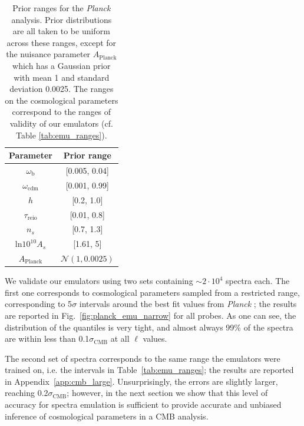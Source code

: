 \documentclass[fleqn,usenatbib]{mnras}
\begin{document}
\begin{table}
  \centering 
  \begin{tabular}{c|c}
    \textbf{Parameter}               &  \textbf{Prior range}   \\
    \hline
    \hline
    $\omega_{\mathrm{b}}$            &   [0.005, 0.04]    \\
    \hline
    $\omega_{\mathrm{cdm}}$          &    [0.001, 0.99]        \\
    \hline
    $h$                              &    [0.2, 1.0]         \\
    \hline
    $\tau_{\mathrm{reio}}$                              &    [0.01, 0.8]         \\
    \hline
    $n_s$                            &        [0.7, 1.3]      \\
    \hline
    $\mathrm{ln}10^{10}A_s$          &      [1.61, 5]       \\
    \hline
    $A_{\mathrm{Planck}}$            &      $\mathcal{N}(1, 0.0025)$       \\
    \hline
    \hline
    \end{tabular}
   \caption{Prior ranges for the \textit{Planck} analysis. Prior distributions are all taken to be uniform across these ranges, except for the nuisance parameter $A_{\mathrm{Planck}}$ which has a Gaussian prior with mean 1 and standard deviation 0.0025. The ranges on the cosmological parameters correspond to the ranges of validity of our emulators (cf. Table \ref{tab:emu_ranges}).}
  \label{tab:prior_planck}
\end{table}

We validate our emulators using two sets containing  $\sim 2 \cdot 10^4$ spectra each. The first one corresponds to cosmological parameters sampled from a restricted range, corresponding to 5$\sigma$ intervals around the best fit values from \textit{Planck} \citep{Planck18}; the results are reported in Fig.~\ref{fig:planck_emu_narrow} for all probes. As one can see, the distribution of the quantiles is very tight, and almost always 99\% of the spectra are within less than 0.1$\sigma_{\textrm{CMB}}$ at all $\ell$ values.

The second set of spectra corresponds to the same range the emulators were trained on, i.e. the intervals in Table~\ref{tab:emu_ranges}; the results are reported in Appendix~\ref{app:cmb_large}. Unsurprisingly, the errors are slightly larger, reaching 0.2$\sigma_{\textrm{CMB}}$; however, in the next section we show that this level of accuracy for spectra emulation is sufficient to provide accurate and unbiased inference of cosmological parameters in a CMB analysis.
\end{document}
